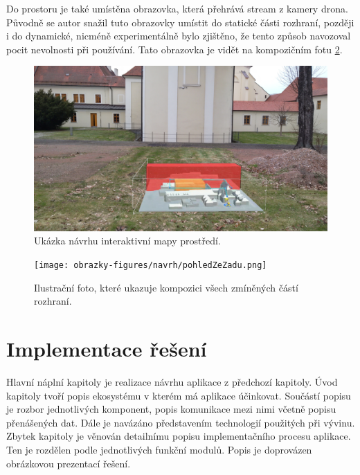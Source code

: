Do prostoru je také umístěna obrazovka, která přehrává stream z kamery drona. Původně se autor snažil tuto obrazovky umístit do statické části rozhraní, později i do dynamické, nicméně experimentálně bylo zjištěno, že tento způsob navozoval pocit nevolnosti při používání. Tato obrazovka je vidět na kompozičním fotu \ref{pic:ShowcaseNavrhBackView}.

\begin{figure}[!ht]
    \centering
    \includegraphics[width=\linewidth]{obrazky-figures/navrh/interaktiveMap.jpg}
    \caption{Ukázka návrhu interaktivní mapy prostředí.}
    \label{pic:MapaNavrh}
\end{figure}

\begin{figure}[!ht]
    \centering
    \texttt{[image: obrazky-figures/navrh/pohledZeZadu.png]}
    \caption{Ilustrační foto, které ukazuje kompozici všech zmíněných částí rozhraní.}
    \label{pic:ShowcaseNavrhBackView}
\end{figure}




\chapter{Implementace řešení}
Hlavní náplní kapitoly je realizace návrhu aplikace z předchozí kapitoly. Úvod kapitoly tvoří popis ekosystému v kterém má aplikace účinkovat. Součástí popisu je rozbor jednotlivých komponent, popis komunikace mezi nimi včetně popisu přenášených dat. Dále je navázáno představením technologií použitých při vývinu. Zbytek kapitoly je věnován detailnímu popisu implementačního procesu aplikace. Ten je rozdělen podle jednotlivých funkční modulů. Popis je doprovázen obrázkovou prezentací řešení.
